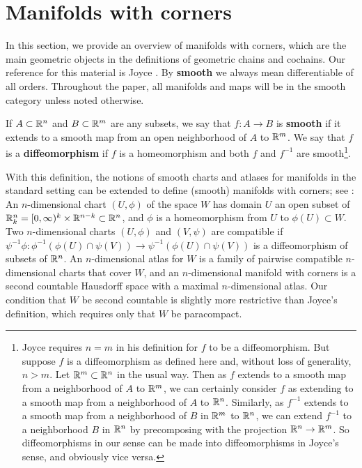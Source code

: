
\section{Manifolds with corners}\label{S: manifolds with corners}

In this section, we provide an overview of manifolds with corners, which are the main geometric objects in the definitions of geometric chains and cochains.
Our reference for this material is Joyce \cite{Joy12}.
By \textbf{smooth} we always mean differentiable of all orders.
Throughout the paper, all manifolds and maps will be in the smooth category unless noted otherwise.

\begin{definition}\label{D: smooth}
	If $A \subset \mathbb{R}^n$ and $B \subset \mathbb{R}^m$ are any subsets, we say that $f \colon A \to B$ is \textbf{smooth} if it extends to a smooth map from an open neighborhood of $A$ to $\mathbb{R}^m$.
	We say that $f$ is a \textbf{diffeomorphism} if $f$ is a homeomorphism and both $f$ and $f^{-1}$ are smooth\footnote{Joyce requires $n = m$ in his definition for $f$ to be a diffeomorphism.
	But suppose $f$ is a diffeomorphism as defined here and, without loss of generality, $n>m$.
	Let $\mathbb{R}^m \subset \mathbb{R}^n$ in the usual way.
	Then as $f$ extends to a smooth map from a neighborhood of $A$ to $\mathbb{R}^m$, we can certainly consider $f$ as extending to a smooth map from a neighborhood of $A$ to $\mathbb{R}^n$.
	Similarly, as $f^{-1}$ extends to a smooth map from a neighborhood of $B$ in $\mathbb{R}^m$ to $\mathbb{R}^n$, we can extend $f^{-1}$ to a neighborhood $B$ in $\mathbb{R}^n$ by precomposing with the projection $\mathbb{R}^n \to \mathbb{R}^m$.
	So diffeomorphisms in our sense can be made into diffeomorphisms in Joyce's sense, and obviously vice versa.}.
\end{definition}

With this definition, the notions of smooth charts and atlases for manifolds in the standard setting can be extended to define (smooth) manifolds with corners; see \cite[Section 2]{Joy12}: An $n$-dimensional chart $(U,\phi)$ of the space $W$ has domain $U$ an open subset of $\mathbb{R}^n_k = [0,\infty)^k \times \mathbb{R}^{n-k} \subset \mathbb{R}^n$, and $\phi$ is a homeomorphism from $U$ to $\phi(U) \subset W$.
Two $n$-dimensional charts $(U,\phi)$ and $(V,\psi)$ are compatible if $\psi^{-1}\phi \colon \phi^{-1}(\phi(U) \cap \psi(V)) \to \psi^{-1}(\phi(U) \cap \psi(V))$ is a diffeomorphism of subsets of $\mathbb{R}^n$.
An $n$-dimensional atlas for $W$ is a family of pairwise compatible $n$-dimensional charts that cover $W$, and an $n$-dimensional manifold with corners is a second countable Hausdorff space with a maximal $n$-dimensional atlas.
Our condition that $W$ be second countable is slightly more restrictive than Joyce's definition, which requires only that $W$ be paracompact. 

